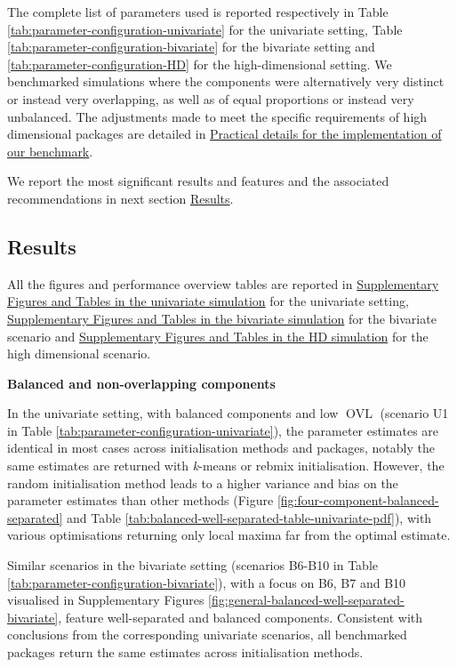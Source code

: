 The complete list of parameters used is reported respectively in Table \ref{tab:parameter-configuration-univariate} for the univariate setting, Table \ref{tab:parameter-configuration-bivariate} for the bivariate setting and \ref{tab:parameter-configuration-HD} for the high-dimensional setting. We benchmarked simulations where the components were alternatively very distinct or instead very overlapping, as well as of equal proportions or instead very unbalanced. The adjustments made to meet the specific requirements of high dimensional packages are detailed in \protect\hyperlink{practical-details-for-the-implementation-of-our-benchmark}{Practical details for the implementation of our benchmark}.

We report the most significant results and features and the associated recommendations in next section \protect\hyperlink{results}{Results}.

\hypertarget{results}{%
\subsection{Results}\label{results}}

All the figures and performance overview tables are reported in \protect\hyperlink{supplementary-figures-and-tables-in-the-univariate-simulation}{Supplementary Figures and Tables in the univariate simulation} for the univariate setting, \protect\hyperlink{supplementary-figures-and-tables-in-the-bivariate-simulation}{Supplementary Figures and Tables in the bivariate simulation} for the bivariate scenario and \protect\hyperlink{supplementary-figures-and-tables-in-the-hd-simulation}{Supplementary Figures and Tables in the HD simulation} for the high dimensional scenario.

\textbf{Balanced and non-overlapping components}

In the univariate setting, with balanced components and low \(\operatorname{OVL}\) (scenario U1 in Table
\ref{tab:parameter-configuration-univariate}), the parameter
estimates are identical in most cases across initialisation methods and packages, notably the same estimates are returned with \emph{k}-means or rebmix initialisation. However, the random initialisation method leads
to a higher variance and bias on the parameter estimates than other
methods (Figure \ref{fig:four-component-balanced-separated} and Table
\ref{tab:balanced-well-separated-table-univariate-pdf}),
with various optimisations returning only local maxima far from the
optimal estimate.

Similar scenarios in the bivariate setting (scenarios B6-B10 in Table \ref{tab:parameter-configuration-bivariate}), with a focus on B6, B7 and B10 visualised in Supplementary Figures \ref{fig:general-balanced-well-separated-bivariate}, feature well-separated and balanced components. Consistent with conclusions from the corresponding univariate scenarios, all benchmarked packages return the same estimates across initialisation methods.

